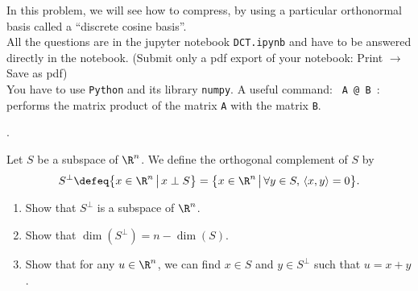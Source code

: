 \documentclass[11pt,nocut]{article}
\begin{document}
\vspace{1cm}


\begin{problem}[3 points]
In this problem, we will see how to compress, by using a particular orthonormal basis called a ``discrete cosine basis''.
\\
All the questions are in the jupyter notebook \texttt{DCT.ipynb} and have to be answered directly in the notebook. (Submit only a pdf export of your notebook: Print $\to$ Save as pdf)
\\
You have to use \texttt{Python} and its library \texttt{numpy}. A useful command:
\texttt{ A @ B }: performs the matrix product of the matrix \texttt{A} with the matrix \texttt{B}.

\end{problem}

\vspace{1cm}.

\begin{problem}[$\star$] Let $S$ be a subspace of $\R^n$. We define the orthogonal complement of $S$ by
	$$
	S^{\perp} \defeq 
	\big\{ x \in \R^n \, \big| \, x \perp S \big\} = 
	\big\{ x \in \R^n \, \big| \, \forall y \in S, \, \langle x,y \rangle = 0 \big\}.
	$$
	\begin{enumerate}[label=\normalfont(\textbf{\alph*})]
		\item Show that $S^{\perp}$ is a subspace of $\R^n$.
		\item Show that $\dim(S^{\perp}) = n - \dim(S)$. 
		\item Show that for any $u \in \R^n$, we can find $x \in S$ and $y \in S^{\perp}$ such that $u = x + y$.
	\end{enumerate}
\end{problem}



%
%
\end{document}
